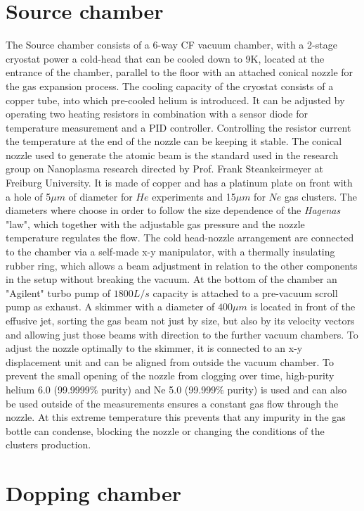 \section{Source chamber}

The Source chamber consists of a 6-way CF vacuum chamber, with a 2-stage cryostat power a cold-head that can be cooled down to 9K, located at the entrance of the chamber, parallel to the floor with an attached conical nozzle for the gas expansion process. The cooling capacity of the cryostat  consists of a copper tube, into which pre-cooled helium is introduced. It can be adjusted by operating two heating resistors in combination with a sensor diode for temperature measurement and a PID controller. Controlling the resistor current the temperature at the end of the nozzle can be keeping it stable. The conical nozzle used to generate the atomic beam is the standard used in the research group on Nanoplasma research directed by Prof. Frank Steankeirmeyer at Freiburg University.  It is made of copper and has a platinum plate on front with a hole of 5$\mu m$ of diameter for $He$ experiments and 15$\mu m$ for $Ne$ gas clusters. The diameters where choose in order to follow the size dependence of the \textit{Hagenas} "law",  which together with the adjustable gas pressure and the nozzle temperature regulates the flow.
The cold head-nozzle arrangement are connected to the chamber via a self-made x-y manipulator,  with a thermally insulating rubber ring, which allows a beam adjustment in relation to the other components in the setup without breaking the vacuum. At the bottom of the chamber an "Agilent" turbo pump of $1800 L/s$ capacity is attached to a pre-vacuum scroll pump as exhaust.
A skimmer with a diameter of $400\mu m$ is located in front of the effusive jet, sorting the gas beam not just by size, but also by its velocity vectors and allowing just those beams with direction to the further vacuum chambers. To adjust the nozzle optimally to the skimmer, it is connected to an x-y displacement unit and can be aligned from outside the vacuum chamber. To prevent the small opening of the nozzle from clogging over time, high-purity helium 6.0 (99.9999$\%$ purity) and Ne 5.0 (99.999$\%$ purity)  is used and can also be used outside of the measurements ensures a constant gas flow through the nozzle. At this extreme temperature this prevents that any impurity in the gas bottle can  condense, blocking the nozzle or changing the conditions of the clusters production. 

\section{Dopping chamber}


